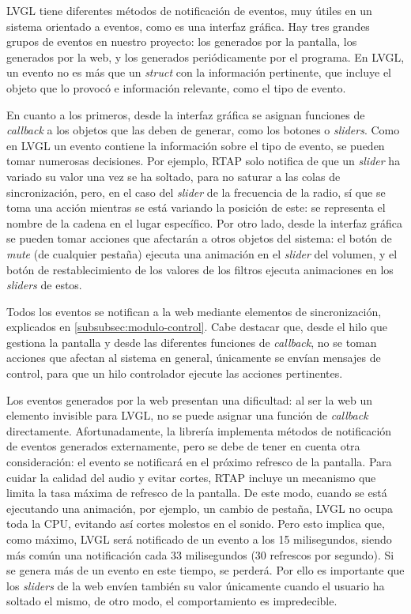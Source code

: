 LVGL tiene diferentes métodos de notificación de eventos, muy útiles en un sistema orientado a eventos, como es una interfaz gráfica. Hay tres grandes grupos de eventos en nuestro proyecto: los generados por la pantalla, los generados por la web, y los generados periódicamente por el programa. En LVGL, un evento no es más que un \textit{struct} con la información pertinente, que incluye el objeto que lo provocó e información relevante, como el tipo de evento.

En cuanto a los primeros, desde la interfaz gráfica se asignan funciones de \textit{callback} a los objetos que las deben de generar, como los botones o \textit{sliders}. Como en LVGL un evento contiene la información sobre el tipo de evento, se pueden tomar numerosas decisiones. Por ejemplo, RTAP solo notifica de que un \textit{slider} ha variado su valor una vez se ha soltado, para no saturar a las colas de sincronización, pero, en el caso del \textit{slider} de la frecuencia de la radio, sí que se toma una acción mientras se está variando la posición de este: se representa el nombre de la cadena en el lugar específico. Por otro lado, desde la interfaz gráfica se pueden tomar acciones que afectarán a otros objetos del sistema: el botón de \textit{mute} (de cualquier pestaña) ejecuta una animación en el \textit{slider} del volumen, y el botón de restablecimiento de los valores de los filtros ejecuta animaciones en los \textit{sliders} de estos.

Todos los eventos se notifican a la web mediante elementos de sincronización, explicados en \autoref{subsubsec:modulo-control}. Cabe destacar que, desde el hilo que gestiona la pantalla y desde las diferentes funciones de \textit{callback}, no se toman acciones que afectan al sistema en general, únicamente se envían mensajes de control, para que un hilo controlador ejecute las acciones pertinentes.

Los eventos generados por la web presentan una dificultad: al ser la web un elemento invisible para LVGL, no se puede asignar una función de \textit{callback} directamente. Afortunadamente, la librería implementa métodos de notificación de eventos generados externamente, pero se debe de tener en cuenta otra consideración: el evento se notificará en el próximo refresco de la pantalla. Para cuidar la calidad del audio y evitar cortes, RTAP incluye un mecanismo que limita la tasa máxima de refresco de la pantalla. De este modo, cuando se está ejecutando una animación, por ejemplo, un cambio de pestaña, LVGL no ocupa toda la CPU, evitando así cortes molestos en el sonido. Pero esto implica que, como máximo, LVGL será notificado de un evento a los 15 milisegundos, siendo más común una notificación cada 33 milisegundos (30 refrescos por segundo). Si se genera más de un evento en este tiempo, se perderá. Por ello es importante que los \textit{sliders} de la web envíen también su valor únicamente cuando el usuario ha soltado el mismo, de otro modo, el comportamiento es impredecible. 

